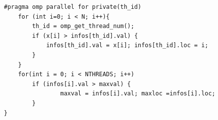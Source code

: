 \documentclass[12pt]{article}
\begin{document}
\begin{enumerate}
\begin{lstlisting}[style=CStyle]
	#pragma omp parallel for private(th_id)
	for (int i=0; i < N; i++){
		th_id = omp_get_thread_num();
		if (x[i] > infos[th_id].val) {
			infos[th_id].val = x[i]; infos[th_id].loc = i;
		}
	}
	for(int i = 0; i < NTHREADS; i++)
		if (infos[i].val > maxval) {
				maxval = infos[i].val; maxloc =infos[i].loc;
		}
}
    \end{lstlisting}
\end{enumerate}
\end{document}
